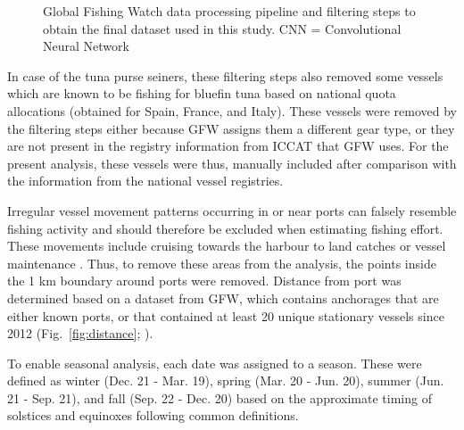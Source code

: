 \begin{figure}[htp]
\begin{center}
	\end{center}
	\caption{Global Fishing Watch data processing pipeline and filtering steps to obtain the final dataset used in this study. CNN = Convolutional Neural Network}
	\label{fig:workflow}
\end{figure}

\medskip

In case of the tuna purse seiners, these filtering steps also removed some vessels which are known
to be fishing for bluefin tuna based on national quota allocations (obtained for Spain, France, and
Italy). These vessels were removed by the filtering steps either because GFW assigns them a
different gear type, or they are not present in the registry information from ICCAT that GFW uses.
For the present analysis, these vessels were thus, manually included after comparison with the
information from the national vessel registries.

\medskip

Irregular vessel movement patterns occurring in or near ports can falsely resemble fishing activity
and should therefore be excluded when estimating fishing effort. These movements include cruising
towards the harbour to land catches or vessel maintenance \citep{souza}. Thus, to remove these
areas from the analysis, the points inside the 1 km boundary around ports were removed. Distance
from port was determined based on a dataset from GFW, which contains anchorages that are either
known ports, or that contained at least 20 unique stationary vessels since 2012
(Fig.~\ref{fig:distance}; \citealp{gfw_distance}).

\medskip

To enable seasonal analysis, each date was assigned to a season. These were defined as winter (Dec.
21 - Mar. 19), spring (Mar. 20 - Jun. 20), summer (Jun. 21 - Sep. 21), and fall (Sep. 22 - Dec. 20)
based on the approximate timing of solstices and equinoxes following common definitions.


